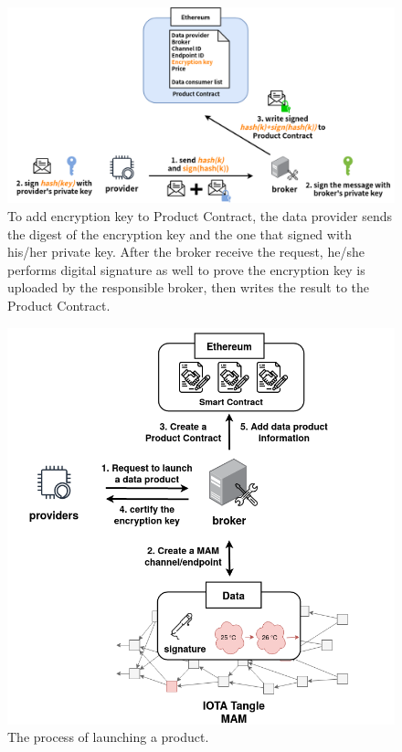 \begin{spacing}{2.0}
\begin{figure}[t]
    \centering
    \includegraphics[width=5.5in]{img/key_upload}
    \caption{To add encryption key to Product Contract, the data provider sends the digest of the encryption key and the one that signed with his/her private key. After the broker receive the request, he/she performs digital signature as well to prove the encryption key is uploaded by the responsible broker, then writes the result to the Product Contract.}
    \label{fig:key_upload}
\end{figure}

\begin{figure}[b]
    \centering
    \includegraphics[width=4.5in]{img/launching_product}
    \caption{The process of launching a product.}
    \label{fig:launching_product}
\end{figure}
\clearpage


\end{spacing}
